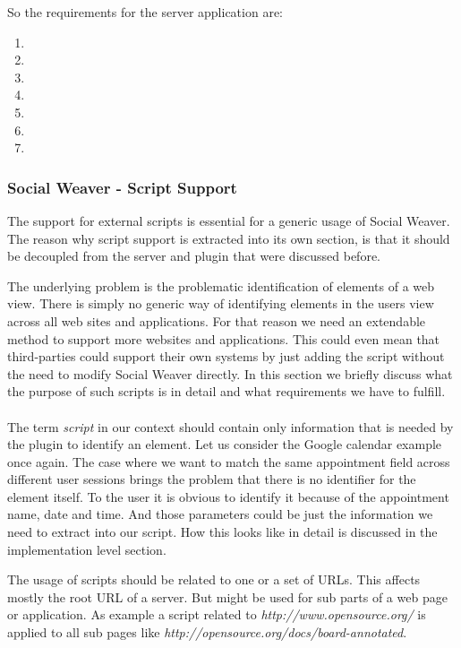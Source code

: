 So the requirements for the server application are:
\begin{enumerate}
\item \reqWSi
\item \reqWSii
\item \reqWSiii
\item \reqWSiv
\item \reqWSv
\item \reqWSvi
\item \reqWSvii
\end{enumerate}

\subsubsection{Social Weaver - Script Support} \label{abstract-script-support-reqs}
The support for external scripts is essential for a generic usage of Social Weaver. The reason why script support is extracted into its own section, is that it should be decoupled from the server and plugin that were discussed before. 

The underlying problem is the problematic identification of elements of a web view. There is simply no generic way of identifying elements in the users view across all web sites and applications. For that reason we need an extendable method to support more websites and applications. This could even mean that third-parties could support their own systems by just adding the script without the need to modify Social Weaver directly. In this section we briefly discuss what the purpose of such scripts is in detail and what requirements we have to fulfill. 
\\ \\
The term \textit{script} in our context should contain only information that is needed by the plugin to identify an element. Let us consider the Google calendar example once again. The case where we want to match the same appointment field across different user sessions brings the problem that there is no identifier for the element itself. To the user it is obvious to identify it because of the appointment name, date and time. And those parameters could be just the information we need to extract into our script. How this looks like in detail is discussed in the implementation level section. 

The usage of scripts should be related to one or a set of URLs. This affects mostly the root URL of a server. But might be used for sub parts of a web page or application. As example a script related to \textit{http://www.opensource.org/} is applied to all sub pages like \textit{http://opensource.org/docs/board-annotated}. 

